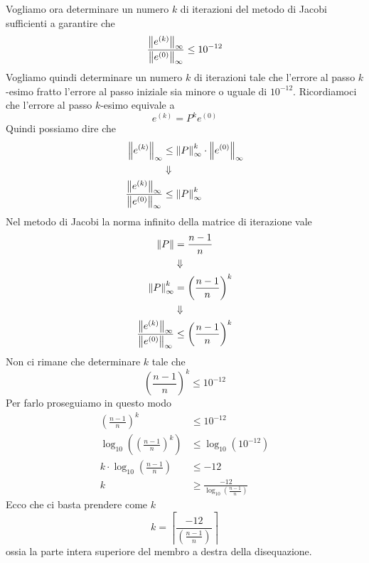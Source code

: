 \begin{example}
	Vogliamo ora determinare un numero $k$ di iterazioni del metodo di Jacobi sufficienti a garantire che
	\[ \frac{\left\lVert e^{(k)}\right\rVert_\infty}{\left\lVert e^{(0)}\right\rVert_\infty} \leq 10^{-12} \]
	Vogliamo quindi determinare un numero $k$ di iterazioni tale che l'errore al passo $k$-esimo fratto l'errore
	al passo iniziale sia minore o uguale di $10^{-12}$. Ricordiamoci che l'errore al passo $k$-esimo equivale a
	\[ e^{(k)} = P^k e^{(0)} \]
	Quindi possiamo dire che
	\begin{align*}
		\left\lVert e^{(k)}\right\rVert_\infty                               & \leq \left\lVert P\right\rVert_\infty^k \cdot \left\lVert e^{(0)}\right\rVert_\infty \\
		                                                    & \Downarrow                                         \\
		\frac{\left\lVert e^{(k)}\right\rVert_\infty}{\left\lVert e^{(0)}\right\rVert_\infty} & \leq \left\lVert P\right\rVert_\infty^k
	\end{align*}
	Nel metodo di Jacobi la norma infinito della matrice di iterazione vale
	\begin{align*}
		\left\lVert P\right\rVert                                            & = \frac{n-1}{n}                     \\
		                                                    & \Downarrow                          \\
		\left\lVert P\right\rVert_\infty^k                                   & = \left( \frac{n-1}{n} \right)^k    \\
		                                                    & \Downarrow                          \\
		\frac{\left\lVert e^{(k)}\right\rVert_\infty}{\left\lVert e^{(0)}\right\rVert_\infty} & \leq \left( \frac{n-1}{n} \right)^k
	\end{align*}
	Non ci rimane che determinare $k$ tale che
	\[ \left( \frac{n-1}{n} \right)^k \leq 10^{-12} \]
	Per farlo proseguiamo in questo modo
	\begin{align*}
		\left( \frac{n-1}{n} \right)^k                          & \leq 10^{-12}             \\
		\log_{10} \left( \left( \frac{n-1}{n} \right)^k \right) & \leq \log_{10} (10^{-12}) \\
		k \cdot \log_{10} \left( \frac{n-1}{n} \right)          & \leq -12                  \\
		k                                                       & \geq \frac{-12}{\log_{10}
			\left( \frac{n-1}{n} \right)}
	\end{align*}
	Ecco che ci basta prendere come $k$
	\[ k = \left\lceil \frac{-12}{\left( \frac{n-1}{n} \right)} \right\rceil \]
	ossia la parte intera superiore del membro a destra della disequazione.
\end{example}

